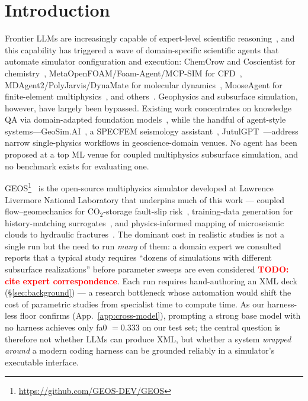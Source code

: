 \documentclass{article}
\newcommand{\todo}[1]{\textcolor{red}{\textbf{TODO: #1}}}
\begin{document}
\section{Introduction}
\label{sec:intro}

Frontier LLMs are increasingly capable of expert-level scientific reasoning~\citep{rein2023gpqa,phan2025hle}, and this capability has triggered a wave of domain-specific scientific agents that automate simulator configuration and execution: ChemCrow and Coscientist for chemistry~\citep{bran2024chemcrow,boiko2023coscientist}, MetaOpenFOAM/Foam-Agent/MCP-SIM for CFD~\citep{chen2024metaopenfoam,yue2025foamagent,mcpsim2026}, MDAgent2/PolyJarvis/DynaMate for molecular dynamics~\citep{shi2026mdagent2,zhao2026polyjarvis,guilbert2025dynamate}, MooseAgent for finite-element multiphysics~\citep{zhan2025mooseagent}, and others~\citep{liu2024asa,luo2025llm4sr}. Geophysics and subsurface simulation, however, have largely been bypassed. Existing work concentrates on knowledge QA via domain-adapted foundation models~\citep{deng2023k2,lin2024geogalactica}, while the handful of agent-style systems---GeoSim.AI~\citep{bekele2025geosim}, a SPECFEM seismology assistant~\citep{li2025seismologyagent}, JutulGPT~\citep{moyner2026jutulgpt}---address narrow single-physics workflows in geoscience-domain venues. No agent has been proposed at a top ML venue for coupled multiphysics subsurface simulation, and no benchmark exists for evaluating one.

GEOS\footnote{\url{https://github.com/GEOS-DEV/GEOS}}~\citep{geos2024} is the open-source multiphysics simulator developed at Lawrence Livermore National Laboratory that underpins much of this work --- coupled flow--geomechanics for CO$_2$-storage fault-slip risk~\citep{he2026faultslip}, training-data generation for history-matching surrogates~\citep{han2024accelerated}, and physics-informed mapping of microseismic clouds to hydraulic fractures~\citep{glubokovskikh2023microseismic}. The dominant cost in realistic studies is not a single run but the need to run \emph{many} of them: a domain expert we consulted reports that a typical study requires ``dozens of simulations with different subsurface realizations'' before parameter sweeps are even considered \todo{cite expert correspondence}. Each run requires hand-authoring an XML deck (\S\ref{sec:background}) --- a research bottleneck whose automation would shift the cost of parametric studies from specialist time to compute time. As our harness-less floor confirms (App.~\ref{app:cross-model}), prompting a strong base model with no harness achieves only fa0 $= 0.333$ on our test set; the central question is therefore not whether LLMs can produce XML, but whether a system \emph{wrapped around} a modern coding harness can be grounded reliably in a simulator's executable interface.
\end{document}
